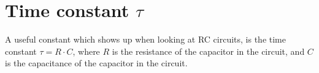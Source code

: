 \section{Time constant $\tau$}
A useful constant which shows up when looking at RC circuits, is the time constant $\tau = R \cdot C$, where $R$ is the resistance of the capacitor in the circuit, and $C$ is the capacitance of the capacitor in the circuit.